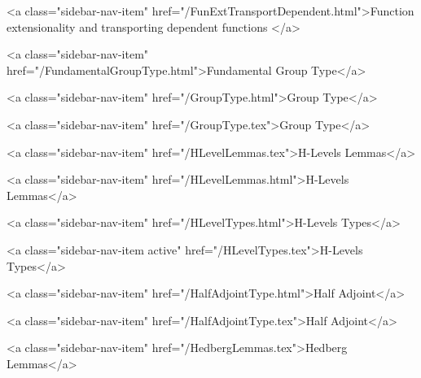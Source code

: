           <a class="sidebar-nav-item" href="/FunExtTransportDependent.html">Function extensionality and transporting dependent functions </a>
        
      
    
      
        
          <a class="sidebar-nav-item" href="/FundamentalGroupType.html">Fundamental Group Type</a>
        
      
    
      
        
          <a class="sidebar-nav-item" href="/GroupType.html">Group Type</a>
        
      
    
      
        
          <a class="sidebar-nav-item" href="/GroupType.tex">Group Type</a>
        
      
    
      
        
          <a class="sidebar-nav-item" href="/HLevelLemmas.tex">H-Levels Lemmas</a>
        
      
    
      
        
          <a class="sidebar-nav-item" href="/HLevelLemmas.html">H-Levels Lemmas</a>
        
      
    
      
        
          <a class="sidebar-nav-item" href="/HLevelTypes.html">H-Levels Types</a>
        
      
    
      
        
          <a class="sidebar-nav-item active" href="/HLevelTypes.tex">H-Levels Types</a>
        
      
    
      
        
          <a class="sidebar-nav-item" href="/HalfAdjointType.html">Half Adjoint</a>
        
      
    
      
        
          <a class="sidebar-nav-item" href="/HalfAdjointType.tex">Half Adjoint</a>
        
      
    
      
        
          <a class="sidebar-nav-item" href="/HedbergLemmas.tex">Hedberg Lemmas</a>
        
      
    
